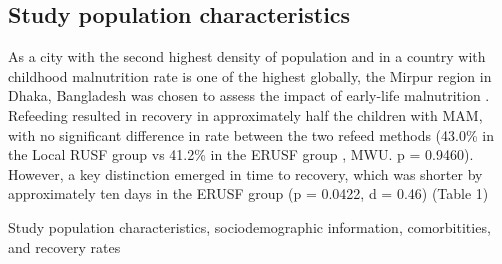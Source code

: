 \documentclass{article}
\begin{document}
\subsection{Study population characteristics}
As a city with the second highest density of population and in a country with childhood malnutrition rate is one of the highest globally, the Mirpur region in Dhaka, Bangladesh was chosen to assess the impact of early-life malnutrition \cite{ahmed2012nutrition}.
Refeeding resulted in recovery in approximately half the children with MAM, with no significant difference in rate between the two refeed methods (43.0\% in the Local RUSF group vs 41.2\% in the ERUSF group , MWU. p = 0.9460).
However, a key distinction emerged in time to recovery, which was shorter by approximately ten days in the ERUSF group (p = 0.0422, d = 0.46) (Table 1)

\begin{table}[h!]
	\centering
	\caption{Study population characteristics, sociodemographic information, comorbitities, and recovery rates}
	\label{Table1}
\end{table}
\end{document}
